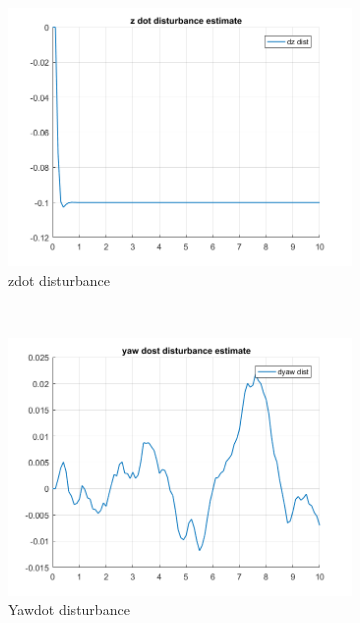 \documentclass[11pt]{article}
\begin{document}
\begin{enumerate}
\begin{figure}[ht]
        \begin{subfigure}[c]{0.3\linewidth}
            \centering
            \includegraphics[width=\linewidth]{Plots_09_OffsetFreeTracking_Constant/08}
            \caption{zdot disturbance}
        \end{subfigure}
        ~
        \begin{subfigure}[c]{0.3\linewidth}
            \centering
            \includegraphics[width=\linewidth]{Plots_09_OffsetFreeTracking_Constant/09}
            \caption{Yawdot disturbance}
        \end{subfigure}
        ~
        \begin{subfigure}[c]{0.3\linewidth}
            \centering

\end{subfigure}
\end{figure}
\end{enumerate}
\end{document}
